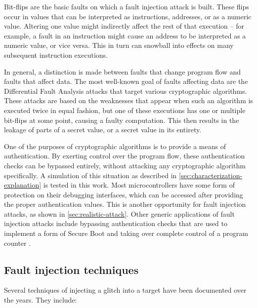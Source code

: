 \documentclass[10pt]{article}
\begin{document}
    Bit-flips are the basic faults on which a fault injection attack is built. These flips occur in values that can be interpreted as instructions, addresses, or as a numeric value. Altering one value might indirectly affect the rest of that execution -- for example, a fault in an instruction might cause an address to be interpreted as a numeric value, or vice versa. This in turn can snowball into effects on many subsequent instruction executions. 

    In general, a distinction is made between faults that change program flow and faults that affect data. The most well-known goal of faults affecting data are the Differential Fault Analysis attacks \cite{biehl_differential_2000,boneh_importance_2001,giraud_dfa_2004} that target various cryptographic algorithms. These attacks are based on the weaknesses that appear when such an algorithm is executed twice in equal fashion, but one of these executions has one or multiple bit-flips at some point, causing a faulty computation. This then results in the leakage of parts of a secret value, or a secret value in its entirety.

    One of the purposes of cryptographic algorithms is to provide a means of authentication. 
    By exerting control over the program flow, these authentication checks can be bypassed entirely, without attacking any cryptographic algorithm specifically. A simulation of this situation as described in \autoref{sec:characterization-explanation} is tested in this work.
    Most microcontrollers have some form of protection on their debugging interfaces, which can be accessed after providing the proper authentication values. This is another opportunity for fault injection attacks, as shown in \autoref{sec:realistic-attack}.
    Other generic applications of fault injection attacks include bypassing authentication checks that are used to implement a form of Secure Boot and taking over complete control of a program counter \cite{timmers_controlling_2016}.


  \subsection{Fault injection techniques }
  \label{sec:faultinjection}

    Several techniques of injecting a glitch into a target have been documented over the years. They include: 
\end{document}
